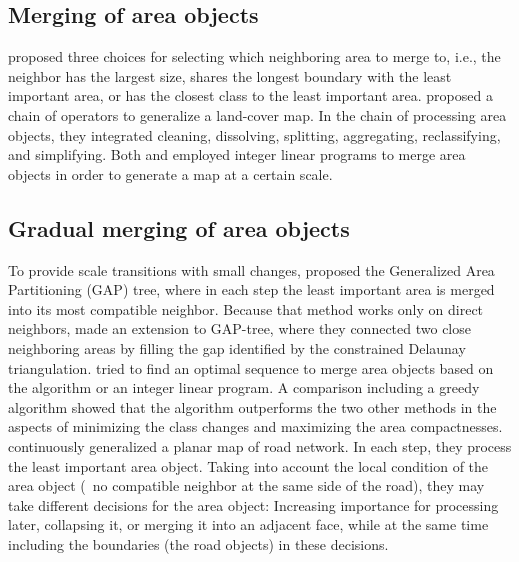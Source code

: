 \documentclass[twocolumn]{svjour3}          %
\begin{document}

\subsection{Merging of area objects}
\citet{Cheng2006} proposed three choices for 
selecting which neighboring area to merge to, i.e.,
the neighbor has the largest size, 
shares the longest boundary with the least important area,
or has the closest class to the least important area.
\citet{Thiemann2018LandCover} proposed a chain of operators 
to generalize a land-cover map.
In the chain of processing area objects, 
they integrated cleaning, dissolving, splitting, 
aggregating, reclassifying, and simplifying.
Both \cite{HaunertWolff2010AreaAgg} and \cite{Oehrlein2017Aggregation} 
employed integer linear programs to merge area objects
in order to generate a map at a certain scale.



\subsection{Gradual merging of area objects}
\label{sec:gradual_merge}

To provide scale transitions with small changes, 
\citet{vanOosterom1995GAPTree} proposed 
the Generalized Area Partitioning (GAP) tree,
where in each step the least important area is merged into
its most compatible neighbor.
Because that method works only on direct neighbors,
\citet{Ai2002GAP} made an extension to GAP-tree,
where they connected two close neighboring areas 
by filling the gap identified by the constrained Delaunay triangulation.
\citet{Peng2020AreaAgg} tried to 
find an optimal sequence to merge area objects 
based on the \Astar algorithm or an integer linear program.
A comparison including a greedy algorithm showed that 
the \Astar algorithm outperforms the two other methods 
in the aspects of minimizing the class changes 
and maximizing the area compactnesses.
\citet{Suba2016Road} continuously generalized a planar map of road network.
In each step, they process the least important area object.
Taking into account the local condition of the area object
(\eg~no compatible neighbor at the same side of the road),
they may take different decisions for the area object: 
Increasing importance for processing later, collapsing it, 
or merging it into an adjacent face, 
while at the same time including the boundaries (the road objects) in these decisions.
\end{document}
